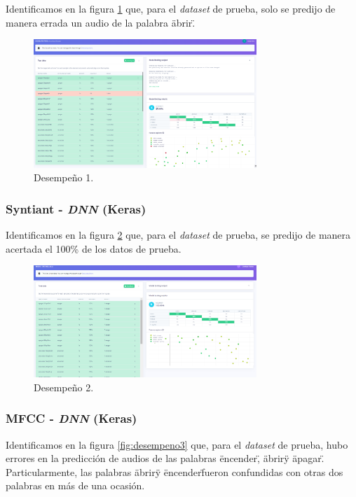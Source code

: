 \documentclass[10pt]{article}
\begin{document}
Identificamos en la figura \ref{fig:desempeno1} que, para el \textit{dataset} de prueba, solo se predijo de manera errada un audio de la palabra \"abrir\".

\begin{figure}
    \centering
    \includegraphics[width=0.75\textwidth]{End classification - Syntiant to DNN.png}
    \caption{Desempeño 1.}
    \label{fig:desempeno1}
\end{figure}

\subsubsection*{Syntiant - \textit{DNN} (Keras)}

Identificamos en la figura \ref{fig:desempeno2} que, para el \textit{dataset} de prueba, se predijo de manera acertada el 100\% de los datos de prueba.

\begin{figure}
    \centering
    \includegraphics[width=0.75\textwidth]{End classification - Syntiant to DNN 2.png}
    \caption{Desempeño 2.}
    \label{fig:desempeno2}
\end{figure}

\subsubsection*{MFCC - \textit{DNN} (Keras)}

Identificamos en la figura \ref{fig:desempeno3} que, para el \textit{dataset} de prueba, hubo errores en la predicción de audios de las palabras \"encender\", \"abrir\" y \"apagar\". Particularmente, las palabras \"abrir\" y \"encender\" fueron confundidas con otras dos palabras en más de una ocasión.
\end{document}
